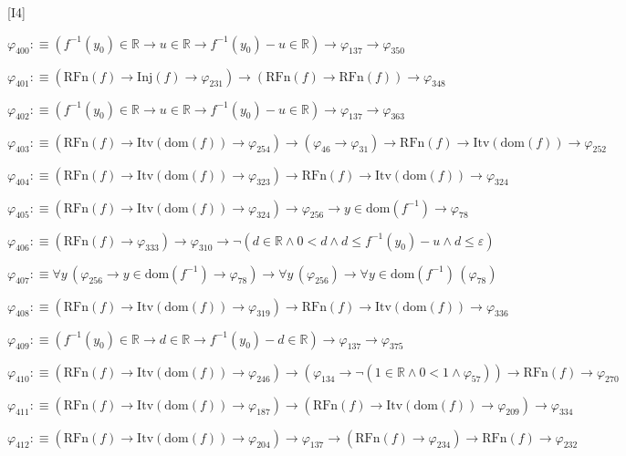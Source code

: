 \begin{fullproof}{[I4]}
\begin{abbrevlist}
\item $\varphi_{400} :\equiv (f^{-1}(y_{0}) \in \mathbb{R} \to u \in \mathbb{R} \to f^{-1}(y_{0}) - u \in \mathbb{R}) \to \varphi_{137} \to \varphi_{350}$
\item $\varphi_{401} :\equiv (\mathrm{RFn}(f) \to \mathrm{Inj}(f) \to \varphi_{231}) \to (\mathrm{RFn}(f) \to \mathrm{RFn}(f)) \to \varphi_{348}$
\item $\varphi_{402} :\equiv (f^{-1}(y_{0}) \in \mathbb{R} \to u \in \mathbb{R} \to f^{-1}(y_{0}) - u \in \mathbb{R}) \to \varphi_{137} \to \varphi_{363}$
\item $\varphi_{403} :\equiv (\mathrm{RFn}(f) \to \mathrm{Itv}(\mathrm{dom}(f)) \to \varphi_{254}) \to (\varphi_{46} \to \varphi_{31}) \to \mathrm{RFn}(f) \to \mathrm{Itv}(\mathrm{dom}(f)) \to \varphi_{252}$
\item $\varphi_{404} :\equiv (\mathrm{RFn}(f) \to \mathrm{Itv}(\mathrm{dom}(f)) \to \varphi_{323}) \to \mathrm{RFn}(f) \to \mathrm{Itv}(\mathrm{dom}(f)) \to \varphi_{324}$
\item $\varphi_{405} :\equiv (\mathrm{RFn}(f) \to \mathrm{Itv}(\mathrm{dom}(f)) \to \varphi_{324}) \to \varphi_{256} \to y \in \mathrm{dom}(f^{-1}) \to \varphi_{78}$
\item $\varphi_{406} :\equiv (\mathrm{RFn}(f) \to \varphi_{333}) \to \varphi_{310} \to \neg (d \in \mathbb{R} \land 0 < d \land d \leq f^{-1}(y_{0}) - u \land d \leq \varepsilon)$
\item $\varphi_{407} :\equiv \forall y\,(\varphi_{256} \to y \in \mathrm{dom}(f^{-1}) \to \varphi_{78}) \to \forall y\,(\varphi_{256}) \to \forall y \in \mathrm{dom}(f^{-1})\,(\varphi_{78})$
\item $\varphi_{408} :\equiv (\mathrm{RFn}(f) \to \mathrm{Itv}(\mathrm{dom}(f)) \to \varphi_{319}) \to \mathrm{RFn}(f) \to \mathrm{Itv}(\mathrm{dom}(f)) \to \varphi_{336}$
\item $\varphi_{409} :\equiv (f^{-1}(y_{0}) \in \mathbb{R} \to d \in \mathbb{R} \to f^{-1}(y_{0}) - d \in \mathbb{R}) \to \varphi_{137} \to \varphi_{375}$
\item $\varphi_{410} :\equiv (\mathrm{RFn}(f) \to \mathrm{Itv}(\mathrm{dom}(f)) \to \varphi_{246}) \to (\varphi_{134} \to \neg (1 \in \mathbb{R} \land 0 < 1 \land \varphi_{57})) \to \mathrm{RFn}(f) \to \varphi_{270}$
\item $\varphi_{411} :\equiv (\mathrm{RFn}(f) \to \mathrm{Itv}(\mathrm{dom}(f)) \to \varphi_{187}) \to (\mathrm{RFn}(f) \to \mathrm{Itv}(\mathrm{dom}(f)) \to \varphi_{209}) \to \varphi_{334}$
\item $\varphi_{412} :\equiv (\mathrm{RFn}(f) \to \mathrm{Itv}(\mathrm{dom}(f)) \to \varphi_{204}) \to \varphi_{137} \to (\mathrm{RFn}(f) \to \varphi_{234}) \to \mathrm{RFn}(f) \to \varphi_{232}$

\end{abbrevlist}
\end{fullproof}
